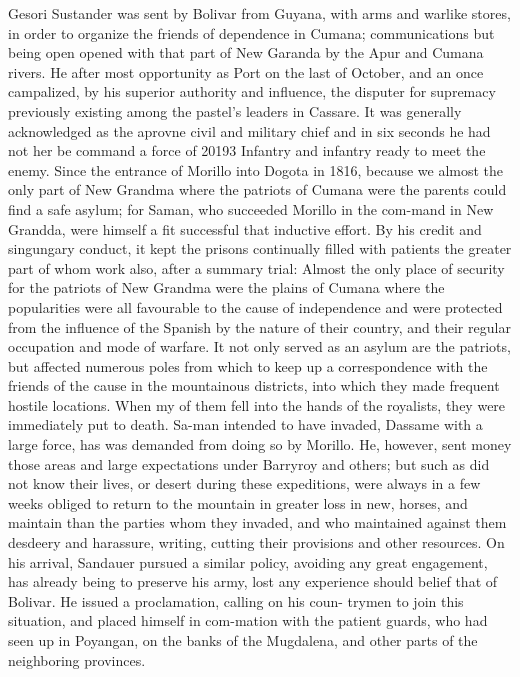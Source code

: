\documentclass[11pt]{article}
\begin{document}
Gesori Sustander was sent by Bolivar from Guyana, with arms and warlike stores, in order to organize the friends of dependence in Cumana; communications but being open opened with that part of New Garanda by the Apur and Cumana rivers. He after most opportunity as Port on the last of October, and an once campalized, by his superior authority and influence, the disputer for supremacy previously existing among the pastel’s leaders in Cassare. It was generally acknowledged as the aprovne civil and military chief and in six seconds he had not her be command a force of 20193 Infantry and infantry ready to meet the enemy. Since the entrance of Morillo into Dogota in 1816, because we almost the only part of New Grandma where the patriots of Cumana were the parents could find a safe asylum; for Saman, who succeeded Morillo in the com-mand in New Grandda, were himself a fit successful that inductive effort. By his credit and singungary conduct, it kept the prisons continually filled with patients the greater part of whom work also, after a summary trial: Almost the only place of security for the patriots of New Grandma were the plains of Cumana where the popularities were all favourable to the cause of independence and were protected from the influence of the Spanish by the nature of their country, and their regular occupation and mode of warfare. It not only served as an asylum are the patriots, but affected numerous poles from which to keep up a correspondence with the friends of the cause in the mountainous districts, into which they made frequent hostile locations. When my of them fell into the hands of the royalists, they were immediately put to death. Sa-man intended to have invaded, Dassame with a large force, has was demanded from doing so by Morillo. He, however, sent money those areas and large expectations under Barryroy and others; but such as did not know their lives, or desert during these expeditions, were always in a few weeks obliged to return to the mountain in greater loss in new, horses, and maintain than the parties whom they invaded, and who maintained against them desdeery and harassure, writing, cutting their provisions and other resources. On his arrival, Sandauer pursued a similar policy, avoiding any great engagement, has already being to preserve his army, lost any experience should belief that of Bolivar. He issued a proclamation, calling on his coun- trymen to join this situation, and placed himself in com-mation with the patient guards, who had seen up in Poyangan, on the banks of the Mugdalena, and other parts of the neighboring provinces.
\par
\end{document}
